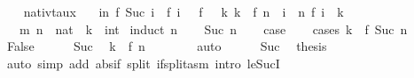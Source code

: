 \begin{isabellebody}
\ \ \isamarkupfalse%
\isanewline
{}\isamarkupfalse%
%
\endisatagproof
{\isafoldproof}%
%
\isadelimproof
%
\endisadelimproof
%
\isadelimdocument
%
\endisadelimdocument
%
\isatagdocument
%
\isamarkuptrue%
%
\endisatagdocument
{\isafolddocument}%
%
\isadelimdocument
%
\endisadelimdocument
{}\isamarkupfalse%
\ nat{\isacharunderscore}{\kern0pt}ivt{\isacharunderscore}{\kern0pt}aux{\isacharcolon}{\kern0pt}\ \isanewline
\ \ {\isachardoublequoteopen}{\isasymlbrakk}{\isasymforall}i{\isacharless}{\kern0pt}n{\isachardot}{\kern0pt}\ {\isasymbar}f\ {\isacharparenleft}{\kern0pt}Suc\ i{\isacharparenright}{\kern0pt}\ {\isacharminus}{\kern0pt}\ f\ i{\isasymbar}\ {\isasymle}\ {}{\isacharsemicolon}{\kern0pt}\ f\ {}\ {\isasymle}\ k{\isacharsemicolon}{\kern0pt}\ k\ {\isasymle}\ f\ n{\isasymrbrakk}\ {\isasymLongrightarrow}\ {\isasymexists}i\ {\isasymle}\ n{\isachardot}{\kern0pt}\ f\ i\ {\isacharequal}{\kern0pt}\ k{\isachardoublequoteclose}\isanewline
\ \ \ m\ n\ {\isacharcolon}{\kern0pt}{\isacharcolon}{\kern0pt}\ nat\ \ k\ {\isacharcolon}{\kern0pt}{\isacharcolon}{\kern0pt}\ int\isanewline
%
\isadelimproof
%
\endisadelimproof
%
\isatagproof
{}\isamarkupfalse%
\ {\isacharparenleft}{\kern0pt}induct\ n{\isacharparenright}{\kern0pt}\isanewline
\ \ \isamarkupfalse%
\ {\isacharparenleft}{\kern0pt}Suc\ n{\isacharparenright}{\kern0pt}\isanewline
\ \ \isamarkupfalse%
\ {\isacharquery}{\kern0pt}case\isanewline
\ \ \isamarkupfalse%
\ {\isacharparenleft}{\kern0pt}cases\ {\isachardoublequoteopen}k\ {\isacharequal}{\kern0pt}\ f\ {\isacharparenleft}{\kern0pt}Suc\ n{\isacharparenright}{\kern0pt}{\isachardoublequoteclose}{\isacharparenright}{\kern0pt}\isanewline
\ \ \ \ \isamarkupfalse%
\ False\isanewline
\ \ \ \ \isamarkupfalse%
\ Suc\ \isamarkupfalse%
\ {\isachardoublequoteopen}k\ {\isasymle}\ f\ n{\isachardoublequoteclose}\isanewline
\ \ \ \ \ \ \isamarkupfalse%
\ auto\isanewline
\ \ \ \ \isamarkupfalse%
\ Suc\ \isamarkupfalse%
\ {\isacharquery}{\kern0pt}thesis\isanewline
\ \ \ \ \ \ \isamarkupfalse%
\ {\isacharparenleft}{\kern0pt}auto\ simp\ add{\isacharcolon}{\kern0pt}\ abs{\isacharunderscore}{\kern0pt}if\ split{\isacharcolon}{\kern0pt}\ if{\isacharunderscore}{\kern0pt}split{\isacharunderscore}{\kern0pt}asm\ intro{\isacharcolon}{\kern0pt}\ le{\isacharunderscore}{\kern0pt}SucI{\isacharparenright}{\kern0pt}\isanewline

\end{isabellebody}
